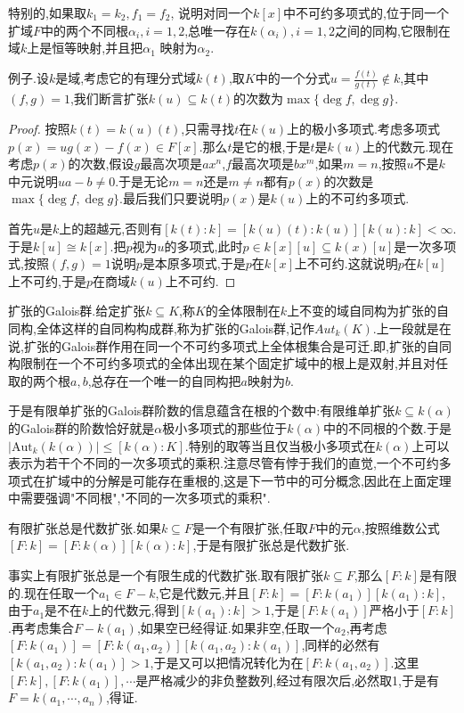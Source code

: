 特别的,如果取$k_1=k_2,f_1=f_2$, 说明对同一个$k[x]$中不可约多项式的,位于同一个扩域$F$中的两个不同根$\alpha_i,i=1,2$,总唯一存在$k(\alpha_i),i=1,2$之间的同构,它限制在域$k$上是恒等映射,并且把$\alpha_1$ 映射为$\alpha_2$.

例子.设$k$是域,考虑它的有理分式域$k(t)$,取$K$中的一个分式$u=\frac{f(t)}{g(t)}\not\in k$,其中$(f,g)=1$,我们断言扩张$k(u)\subseteq k(t)$的次数为$\max\{\deg f,\deg g\}$.
\begin{proof}
	
	按照$k(t)=k(u)(t)$,只需寻找$t$在$k(u)$上的极小多项式.考虑多项式$p(x)=ug(x)-f(x)\in F[x]$.那么$t$是它的根,于是$t$是$k(u)$上的代数元.现在考虑$p(x)$的次数,假设$g$最高次项是$ax^n$,$f$最高次项是$bx^m$,如果$m=n$,按照$u$不是$k$中元说明$ua-b\not=0$.于是无论$m=n$还是$m\not=n$都有$p(x)$的次数是$\max\{\deg f,\deg g\}$.最后我们只要说明$p(x)$是$k(u)$上的不可约多项式.
	
	首先$u$是$k$上的超越元,否则有$[k(t):k]=[k(u)(t):k(u)][k(u):k]<\infty$.于是$k[u]\cong k[x]$.把$p$视为$u$的多项式,此时$p\in k[x][u]\subseteq k(x)[u]$是一次多项式,按照$(f,g)=1$说明$p$是本原多项式,于是$p$在$k[x]$上不可约.这就说明$p$在$k[u]$上不可约,于是$p$在商域$k(u)$上不可约.
\end{proof}

扩张的Galois群.给定扩张$k\subseteq K$,称$K$的全体限制在$k$上不变的域自同构为扩张的自同构,全体这样的自同构构成群,称为扩张的Galois群,记作$Aut_k(K)$.上一段就是在说,扩张的Galois群作用在同一个不可约多项式上全体根集合是可迁.即,扩张的自同构限制在一个不可约多项式的全体出现在某个固定扩域中的根上是双射,并且对任取的两个根$a,b$,总存在一个唯一的自同构把$a$映射为$b$.

于是有限单扩张的Galois群阶数的信息蕴含在根的个数中:有限维单扩张$k\subseteq k(\alpha)$的Galois群的阶数恰好就是$\alpha$极小多项式的那些位于$k(\alpha)$中的不同根的个数.于是$|\mathrm{Aut}_k(k(\alpha))|\le [k(\alpha):K]$.特别的取等当且仅当极小多项式在$k(\alpha)$上可以表示为若干个不同的一次多项式的乘积.注意尽管有悖于我们的直觉,一个不可约多项式在扩域中的分解是可能存在重根的,这是下一节中的可分概念,因此在上面定理中需要强调"不同根","不同的一次多项式的乘积".

有限扩张总是代数扩张.如果$k\subseteq F$是一个有限扩张,任取$F$中的元$\alpha$,按照维数公式$[F:k]= [F:k(\alpha)][k(\alpha):k]$,于是有限扩张总是代数扩张.

事实上有限扩张总是一个有限生成的代数扩张.取有限扩张$k\subseteq F$,那么$[F:k]$是有限的.现在任取一个$a_1\in F-k$,它是代数元,并且$[F:k]=[F:k(a_1)][k(a_1):k]$,由于$a_1$是不在$k$上的代数元,得到$[k(a_1):k]>1$,于是$[F:k(a_1)]$严格小于$[F:k]$.再考虑集合$F-k(a_1)$,如果空已经得证.如果非空,任取一个$a_2$,再考虑$[F:k(a_1)]=[F:k(a_1,a_2)][k(a_1,a_2):k(a_1)]$,同样的必然有$[k(a_1,a_2):k(a_1)]>1$,于是又可以把情况转化为在$[F:k(a_1,a_2)]$.这里$[F:k],[F:k(a_1)],\cdots$是严格减少的非负整数列,经过有限次后,必然取1,于是有$F=k(a_1,\cdots,a_n)$,得证.

